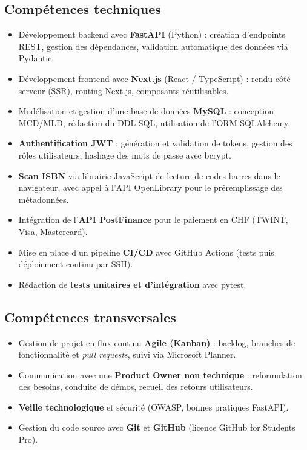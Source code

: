 \documentclass[12pt, a4paper]{report}
\renewcommand{\_}{\origunderscore\allowbreak}
\begin{document}
\subsection{Compétences techniques}
\begin{itemize}
    \item Développement backend avec \textbf{FastAPI} (Python) : création d'endpoints REST, gestion des dépendances, validation automatique des données via Pydantic.
    \item Développement frontend avec \textbf{Next.js} (React / TypeScript) : rendu côté serveur (SSR), routing Next.js, composants réutilisables.
    \item Modélisation et gestion d'une base de données \textbf{MySQL} : conception MCD/MLD, rédaction du DDL SQL, utilisation de l'ORM SQLAlchemy.
    \item \textbf{Authentification JWT} : génération et validation de tokens, gestion des rôles utilisateurs, hashage des mots de passe avec bcrypt.
    \item \textbf{Scan ISBN} via librairie JavaScript de lecture de codes-barres dans le navigateur, avec appel à l'API OpenLibrary pour le préremplissage des métadonnées.
    \item Intégration de l'\textbf{API PostFinance} pour le paiement en CHF (TWINT, Visa, Mastercard).
    \item Mise en place d'un pipeline \textbf{CI/CD} avec GitHub Actions (tests puis déploiement continu par SSH).
    \item Rédaction de \textbf{tests unitaires et d'intégration} avec pytest.
\end{itemize}

\subsection{Compétences transversales}
\begin{itemize}
    \item Gestion de projet en flux continu \textbf{Agile (Kanban)} : backlog, branches de fonctionnalité et \textit{pull requests}, suivi via Microsoft Planner.
    \item Communication avec une \textbf{Product Owner non technique} : reformulation des besoins, conduite de démos, recueil des retours utilisateurs.
    \item \textbf{Veille technologique} et sécurité (OWASP, bonnes pratiques FastAPI).
    \item Gestion du code source avec \textbf{Git} et \textbf{GitHub} (licence GitHub for Students Pro).
\end{itemize}
\end{document}
